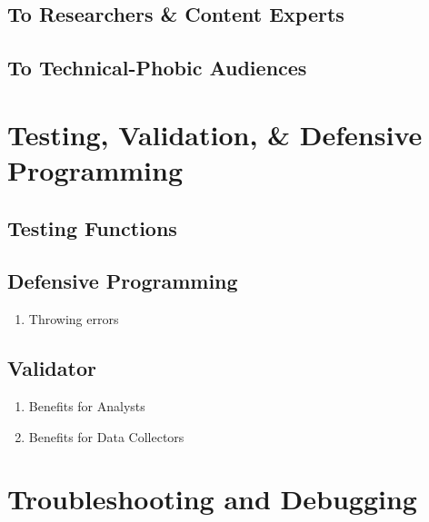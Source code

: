 \documentclass[
]{book}
\providecommand{\tightlist}{%
  \setlength{\itemsep}{0pt}\setlength{\parskip}{0pt}}
\begin{document}
\hypertarget{to-researchers-content-experts}{%
\section{To Researchers \& Content Experts}\label{to-researchers-content-experts}}

\hypertarget{to-technical-phobic-audiences}{%
\section{To Technical-Phobic Audiences}\label{to-technical-phobic-audiences}}

\hypertarget{testing-and-validation}{%
\chapter{Testing, Validation, \& Defensive Programming}\label{testing-and-validation}}

\hypertarget{testing-functions}{%
\section{Testing Functions}\label{testing-functions}}

\hypertarget{defensive-programming}{%
\section{Defensive Programming}\label{defensive-programming}}

\begin{enumerate}
\def\labelenumi{\arabic{enumi}.}
\tightlist
\item
  Throwing errors
\end{enumerate}

\hypertarget{validator}{%
\section{Validator}\label{validator}}

\begin{enumerate}
\def\labelenumi{\arabic{enumi}.}
\tightlist
\item
  Benefits for Analysts
\item
  Benefits for Data Collectors
\end{enumerate}

\hypertarget{troubleshooting}{%
\chapter{Troubleshooting and Debugging}\label{troubleshooting}}
\end{document}
